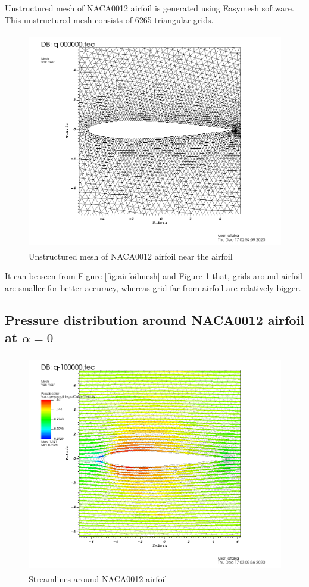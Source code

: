 \documentclass[letterpaper,12pt]{article}
\begin{document}
\vspace{2cm}

Unstructured mesh of NACA0012 airfoil is generated using Easymesh software. This 
unstructured mesh consists of 6265 triangular grids.

\newpage

\begin{figure} [!h]
	\centering
	\includegraphics[height = 9.5cm]{graph/medium/medium_62650001.png}
	\caption{Unstructured mesh of NACA0012 airfoil near the airfoil}
    \label{fig:airfoilmeshclose}
\end{figure}

\vspace{2cm}

It can be seen from Figure \ref{fig:airfoilmesh} and Figure \ref{fig:airfoilmeshclose} that, grids around 
airfoil are smaller for better accuracy, whereas grid far from airfoil are relatively bigger.
\newpage

\subsection{Pressure distribution around NACA0012 airfoil at $\alpha = 0$}

\begin{figure} [!h]
	\centering
	\includegraphics[height = 9.5cm]{graph/medium/medium_streamline0000.png}
	\caption{Streamlines around NACA0012 airfoil}
    \label{fig:airfoilstreamline}
\end{figure}
\end{document}
